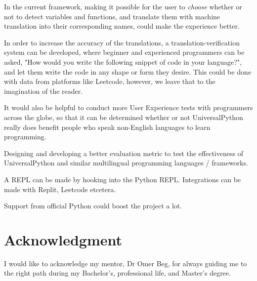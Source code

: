 \documentclass[conference]{IEEEtran}
\begin{document}
In the current framework, making it possible for the user to \textit{choose} whether or not to detect variables and functions, and translate them with machine translation into their corresponding names, could make the experience better.

In order to increase the accuracy of the translations, a translation-verification system can be developed, where beginner and experienced programmers can be asked, "How would you write the following snippet of code in your language?", and let them write the code in any shape or form they desire. This could be done with data from platforms like Leetcode, however, we leave that to the imagination of the reader.

It would also be helpful to conduct more User Experience tests with programmers across the globe, so that it can be determined whether or not UniversalPython really does benefit people who speak non-English languages to learn programming.

Designing and developing a better evaluation metric to test the effectiveness of UniversalPython and similar multilingual programming languages / frameworks.

A REPL can be made by hooking into the Python REPL. Integrations can be made with Replit, Leetcode etcetera.

Support from official Python could boost the project a lot.

\section*{Acknowledgment}

I would like to acknowledge my mentor, Dr Omer Beg, for always guiding me to the right path during my Bachelor's, professional life, and Master's degree.

 

\vspace{12pt}
\end{document}
